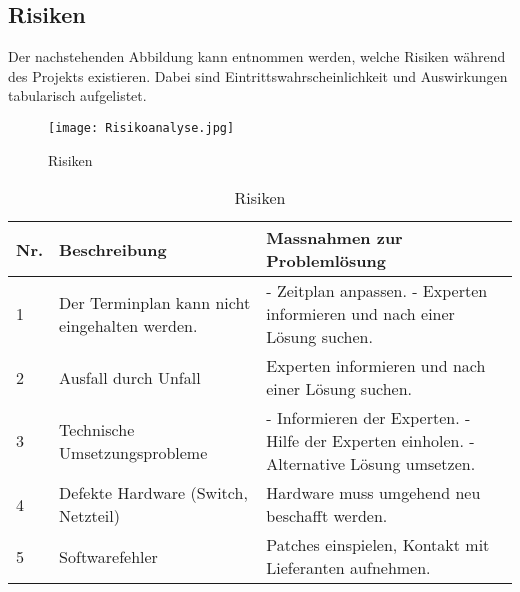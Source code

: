
\subsection{Risiken}
Der nachstehenden Abbildung kann entnommen werden, welche Risiken während des Projekts existieren. Dabei sind  Eintrittswahrscheinlichkeit und Auswirkungen tabularisch aufgelistet.
\begin{figure}[htb]
\centering
\texttt{[image: Risikoanalyse.jpg]}
\caption{Risiken}
\label{fig:Risk}
\end{figure} 

\begin{table}[H]
\centering
\begin{tabular}{p{1cm}p{6cm}p{9cm}}
\hline
\rowcolor{heading} \textbf{Nr.} & \textbf{Beschreibung} & \textbf{Massnahmen zur Problemlösung} \\\hline
1 & Der Terminplan kann nicht eingehalten werden. & - Zeitplan anpassen. \newline - Experten informieren und nach einer Lösung suchen. \\\hline
2 & Ausfall durch Unfall & Experten informieren und nach einer Lösung suchen.  \\\hline
3 & Technische Umsetzungsprobleme & - Informieren der Experten. \newline - Hilfe der Experten einholen. \newline - Alternative Lösung umsetzen. \\\hline
4 & Defekte Hardware (Switch, Netzteil) & Hardware muss umgehend neu beschafft werden.  \\\hline
5 & Softwarefehler & Patches einspielen, Kontakt mit Lieferanten aufnehmen.  \\\hline
\end{tabular}
\caption{Risiken}
\end{table}


